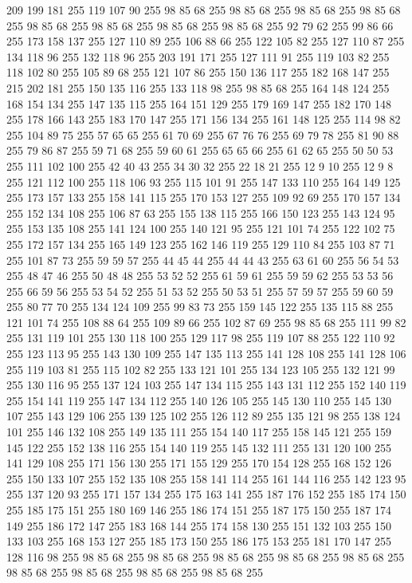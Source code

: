 209 199 181 255 119 107 90 255 98 85 68 255 98 85 68 255 98 85 68 255 98 85 68 255 98 85 68 255 98 85 68 255 98 85 68 255 98 85 68 255 92 79 62 255 99 86 66 255 173 158 137 255 127 110 89 255 106 88 66 255 122 105 82 255 127 110 87 255 134 118 96 255 132 118 96 255 203 191 171 255 127 111 91 255 119 103 82 255 118 102 80 255 105 89 68 255 121 107 86 255 150 136 117 255 182 168 147 255 215 202 181 255 150 135 116 255 133 118 98 255 98 85 68 255 164 148 124 255 168 154 134 255 147 135 115 255 164 151 129 255 179 169 147 255 182 170 148 255 178 166 143 255 183 170 147 255 171 156 134 255 161 148 125 255 114 98 82 255 104 89 75 255 57 65 65 255 61 70 69 255 67 76 76 255 69 79 78 255 81 90 88 255 79 86 87 255 59 71 68 255 59 60 61 255 65 65 66 255 61 62 65 255 50 50 53 255 111 102 100 255 42 40 43 255 34 30 32 255 22 18 21 255 12 9 10 255 12 9 8 255 121 112 100 255 118 106 93 255 115 101 91 255 147 133 110 255
164 149 125 255 173 157 133 255 158 141 115 255 170 153 127 255 109 92 69 255 170 157 134 255 152 134 108 255 106 87 63 255 155 138 115 255 166 150 123 255 143 124 95 255 153 135 108 255 141 124 100 255 140 121 95 255 121 101 74 255 122 102 75 255 172 157 134 255 165 149 123 255 162 146 119 255 129 110 84 255 103 87 71 255 101 87 73 255 59 59 57 255 44 45 44 255 44 44 43 255 63 61 60 255 56 54 53 255 48 47 46 255 50 48 48 255 53 52 52 255 61 59 61 255 59 59 62 255 53 53 56 255 66 59 56 255 53 54 52 255 51 53 52 255 50 53 51 255 57 59 57 255 59 60 59 255 80 77 70 255 134 124 109 255 99 83 73 255 159 145 122 255 135 115 88 255 121 101 74 255 108 88 64 255 109 89 66 255 102 87 69 255 98 85 68 255 111 99 82 255 131 119 101 255 130 118 100 255 129 117 98 255 119 107 88 255 122 110 92 255 123 113 95 255 143 130 109 255 147 135 113 255 141 128 108 255 141 128 106 255 119 103 81 255 115 102 82 255 133 121 101 255 134 123 105 255
132 121 99 255 130 116 95 255 137 124 103 255 147 134 115 255 143 131 112 255 152 140 119 255 154 141 119 255 147 134 112 255 140 126 105 255 145 130 110 255 145 130 107 255 143 129 106 255 139 125 102 255 126 112 89 255 135 121 98 255 138 124 101 255 146 132 108 255 149 135 111 255 154 140 117 255 158 145 121 255 159 145 122 255 152 138 116 255 154 140 119 255 145 132 111 255 131 120 100 255 141 129 108 255 171 156 130 255 171 155 129 255 170 154 128 255 168 152 126 255 150 133 107 255 152 135 108 255 158 141 114 255 161 144 116 255 142 123 95 255 137 120 93 255 171 157 134 255 175 163 141 255 187 176 152 255 185 174 150 255 185 175 151 255 180 169 146 255 186 174 151 255 187 175 150 255 187 174 149 255 186 172 147 255 183 168 144 255 174 158 130 255 151 132 103 255 150 133 103 255 168 153 127 255 185 173 150 255 186 175 153 255 181 170 147 255 128 116 98 255 98 85 68 255 98 85 68 255 98 85 68 255 98 85 68 255 98 85 68 255 98 85 68 255 98 85 68 255 98 85 68 255 98 85 68 255
